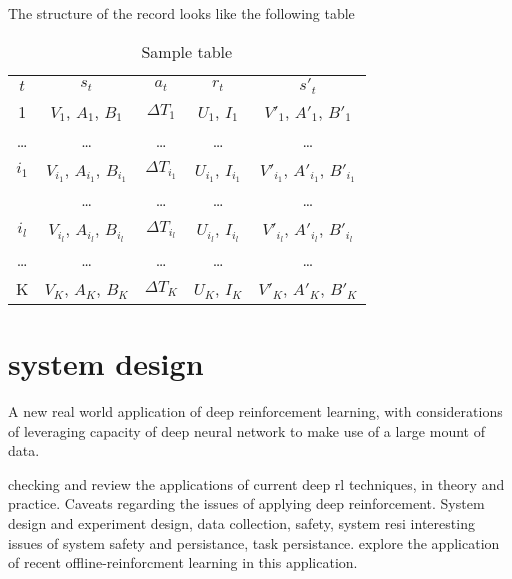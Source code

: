 \documentclass{article}
\begin{document}
The structure of the record looks like the following table


\begin{table}
	\caption{Sample table}
	\centering
	\begin{tabular}{c c c c c}
		\toprule
		$t$                 & $s_{t}$                   & $a_t$           & $r_t$                 & $s'_t$ \\
		\cmidrule(r){1-1} \cmidrule(r){2-4} \cmidrule{5-5}
        1                   & $V_1$, $A_1$, $B_1$       & $\Delta T_{1}$  &  $U_{1}$, $I_{1}$   & $V'_1$, $A'_1$, $B'_1$ \\
        \ldots                   &     \ldots                   & \ldots                & \ldots                    & \ldots \\
        $i_{1}$             & $V_{i_{1}}$, $A_{i_{1}}$, $B_{i_{1}}$      & $\Delta T_{i_{1}}$      & $U_{i_{1}}$, $I_{i_{1}}$    & $V'_{i_{1}}$, $A'_{i_{1}}$, $B'_{i_{1}}$  \\
                            &   \ldots                     & \ldots            & \ldots                      & \ldots \\
        $i_{l}$             & $V_{i_{l}}$, $A_{i_l}$, $B_{i_l}$         &  $\Delta T_{i_{l}}$     & $U_{i_{l}}$, $I_{i_{l}}$   & $V'_{i_{l}}$, $A'_{i_{l}}$, $B'_{i_{l}}$ \\
        \ldots                 &     \ldots                     & \ldots                  & \ldots               & \ldots \\
        K                 & $V_K$, $A_K$, $B_K$  & $\Delta T_{K}$     & $U_K$, $I_K$   & $V'_K$, $A'_K$, $B'_K$ \\
		\bottomrule
	\end{tabular}
	\label{tab:table}
\end{table}

\section{system design}
\label{sec:design}

A new real world application of deep reinforcement learning, with considerations of leveraging capacity of deep neural network to make use of a large mount of data.

checking and review the applications of current deep rl techniques, in theory and practice. Caveats regarding the issues of applying deep reinforcement. System design and experiment design, data collection, safety, system resi
interesting issues of system safety and persistance, task persistance.
explore the application of recent offline-reinforcment learning in this application.
\end{document}
